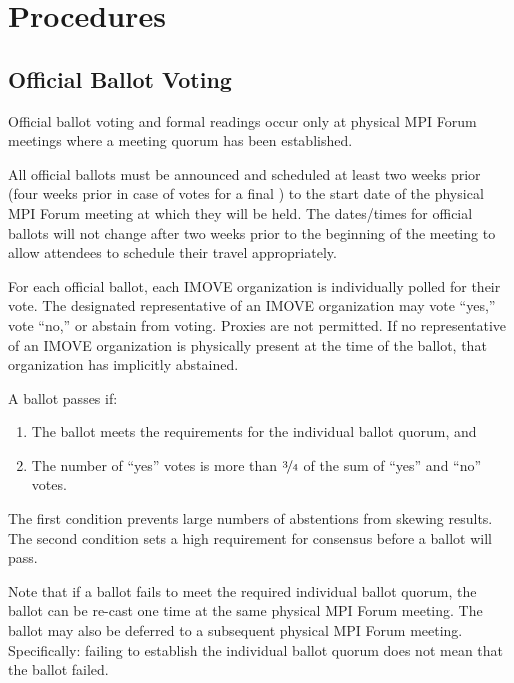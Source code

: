 
\section{Procedures}


\subsection{Official Ballot Voting}

Official ballot voting and formal readings occur only at physical MPI
Forum meetings where a meeting quorum has been established.

All official ballots must be announced and scheduled at least two
weeks prior (four weeks prior in case of votes for a final {\color{red}{MPI Standard
Document}}) to the start date of the physical MPI Forum meeting at
which they will be held.  The dates/times for official ballots will
not change after two weeks prior to the beginning of the meeting to
allow attendees to schedule their travel appropriately.

For each official ballot, each IMOVE organization is individually
polled for their vote.  The designated representative of an IMOVE
organization may vote ``yes,'' vote ``no,'' or abstain from voting.
Proxies are not permitted.  If no representative of an IMOVE
organization is physically present at the time of the ballot, that
organization has implicitly abstained.

A ballot passes if:

\begin{enumerate}
\item The ballot meets the requirements for the individual ballot
  quorum, and
\item The number of ``yes'' votes is more than $\nicefrac{3}{4}$ of
  the sum of ``yes'' and ``no'' votes.
\end{enumerate}

\begin{rationale}
  The first condition prevents large numbers of abstentions from
  skewing results.  The second condition sets a high requirement for
  consensus before a ballot will pass.
\end{rationale}

Note that if a ballot fails to meet the required individual ballot
quorum, the ballot can be re-cast one time at the same physical MPI
Forum meeting.  The ballot may also be deferred to a subsequent
physical MPI Forum meeting.  Specifically: failing to establish the
individual ballot quorum does not mean that the ballot failed.

